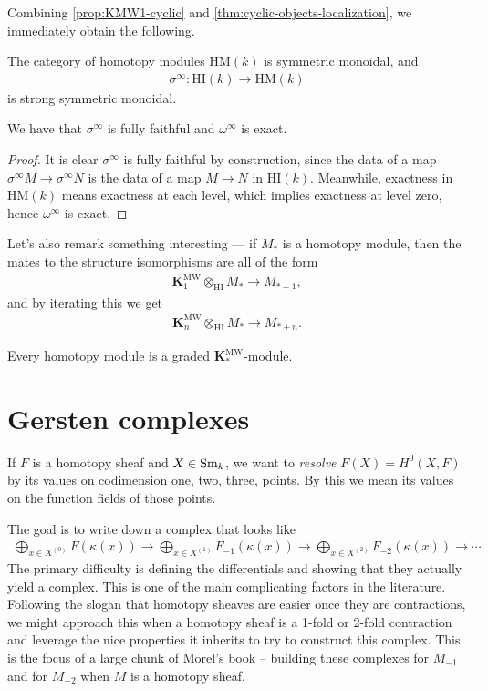 \documentclass[11pt,openany]{book}
\providecommand{\HI}{\mathrm{HI}}
\providecommand{\HM}{\mathrm{HM}}
\providecommand{\KMW}{\mathbf{K}^\mathrm{MW}}
\begin{document}
Combining \autoref{prop:KMW1-cyclic} and \autoref{thm:cyclic-objects-localization}, we immediately obtain the following.

\begin{corollary} The category of homotopy modules $\HM(k)$ is symmetric monoidal, and
\begin{align*}
    \sigma^\infty \colon \HI(k) \to \HM(k)
\end{align*}
is strong symmetric monoidal.
\end{corollary}

\begin{proposition} We have that $\sigma^\infty$ is fully faithful and $\omega^\infty$ is exact.
\end{proposition}
\begin{proof} It is clear $\sigma^\infty$ is fully faithful by construction, since the data of a map $\sigma^\infty M \to \sigma^\infty N$ is the data of a map $M \to N$ in $\HI(k)$. Meanwhile, exactness in $\HM(k)$ means exactness at each level, which implies exactness at level zero, hence $\omega^\infty$ is exact.
\end{proof}


Let's also remark something interesting --- if $M_\ast$ is a homotopy module, then the mates to the structure isomorphisms are all of the form
\begin{align*}
    \KMW_1 \otimes_\HI M_\ast \to M_{\ast+1},
\end{align*}
and by iterating this we get
\begin{align*}
    \KMW_n \otimes_\HI M_\ast \to M_{\ast+n}.
\end{align*}
%
\begin{remark} Every homotopy module is a graded $\KMW_\ast$-module.
\end{remark}

\section{Gersten complexes}

If $F$ is a homotopy sheaf and $X\in \mathrm{Sm}_k$, we want to \textit{resolve} $F(X) = H^0(X,F)$ by its values on codimension one, two, three, points. By this we mean its values on the function fields of those points.

The goal is to write down a complex that looks like
\begin{align*}
    \bigoplus_{x\in X^{(0)}} F(\kappa(x)) \to \bigoplus_{x\in X^{(1)}} F_{-1}(\kappa(x)) \to \bigoplus_{x\in X^{(2)}} F_{-2}(\kappa(x)) \to \cdots 
\end{align*}
The primary difficulty is defining the differentials and showing that they actually yield a complex. This is one of the main complicating factors in the literature. Following the slogan that homotopy sheaves are easier once they are contractions, we might approach this when a homotopy sheaf is a 1-fold or 2-fold contraction and leverage the nice properties it inherits to try to construct this complex. This is the focus of a large chunk of Morel's book -- building these complexes for $M_{-1}$ and for $M_{-2}$ when $M$ is a homotopy sheaf.
\end{document}
